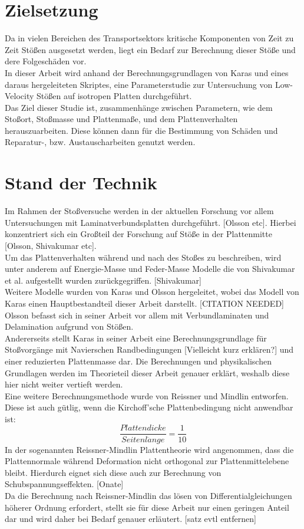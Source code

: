 \section{Zielsetzung}
Da in vielen Bereichen des Transportsektors kritische Komponenten von Zeit zu Zeit Stößen ausgesetzt werden, liegt ein Bedarf zur Berechnung dieser Stöße und dere Folgeschäden vor. \\
In dieser Arbeit wird anhand der Berechnungsgrundlagen von Karas und eines daraus hergeleiteten Skriptes, eine Parameterstudie zur Untersuchung von Low-Velocity Stößen auf isotropen Platten durchgeführt. \\
Das Ziel dieser Studie ist, zusammenhänge zwischen Parametern, wie dem Stoßort, Stoßmasse und Plattenmaße, und dem Plattenverhalten herauszuarbeiten. Diese können dann für die Bestimmung von Schäden und Reparatur-, bzw. Austauscharbeiten genutzt werden.\\
\section{Stand der Technik}
Im Rahmen der Stoßversuche werden in der aktuellen Forschung vor allem Untersuchungen mit Laminatverbundsplatten durchgeführt. [Olsson etc]. Hierbei konzentriert sich ein Großteil der Forschung auf Stöße in der Plattenmitte [Olsson, Shivakumar etc]. \\
Um das Plattenverhalten während und nach des Stoßes zu beschreiben, wird unter anderem auf Energie-Masse und Feder-Masse Modelle die von Shivakumar et al. aufgestellt wurden zurückgegriffen. [Shivakumar] \\
Weitere Modelle wurden von Karas und Olsson hergeleitet, wobei das Modell von Karas einen Hauptbestandteil dieser Arbeit darstellt. [CITATION NEEDED] Olsson befasst sich in seiner Arbeit vor allem mit Verbundlaminaten und Delamination aufgrund von Stößen. \\
Andererseits stellt Karas in seiner Arbeit eine Berechnungsgrundlage für Stoßvorgänge mit Navierschen Randbedingungen [Vielleicht kurz erklären?] und einer reduzierten Plattenmasse dar. Die Berechnungen und physikalischen Grundlagen werden im Theorieteil dieser Arbeit genauer erklärt, weshalb diese hier nicht weiter vertieft werden.\\
Eine weitere Berechnungsmethode wurde von Reissner und Mindlin entworfen. Diese ist auch gütlig, wenn die Kirchoff'sche Plattenbedingung nicht anwendbar ist:
\begin{equation}
\frac{Plattendicke}{Seitenl\ddot{a}nge} = \frac{1}{10}
\end{equation}
In der sogenannten Reissner-Mindlin Plattentheorie wird angenommen, dass die Plattennormale während Deformation nicht orthogonal zur Plattenmittelebene bleibt. Hierdurch eignet sich diese auch zur Berechnung von Schubspannungseffekten. [Onate]\\
Da die Berechnung nach Reissner-Mindlin das lösen von Differentialgleichungen höherer Ordnung erfordert, stellt sie für diese Arbeit nur einen geringen Anteil dar und wird daher bei Bedarf genauer erläutert. [satz evtl entfernen]\\

 
 
 